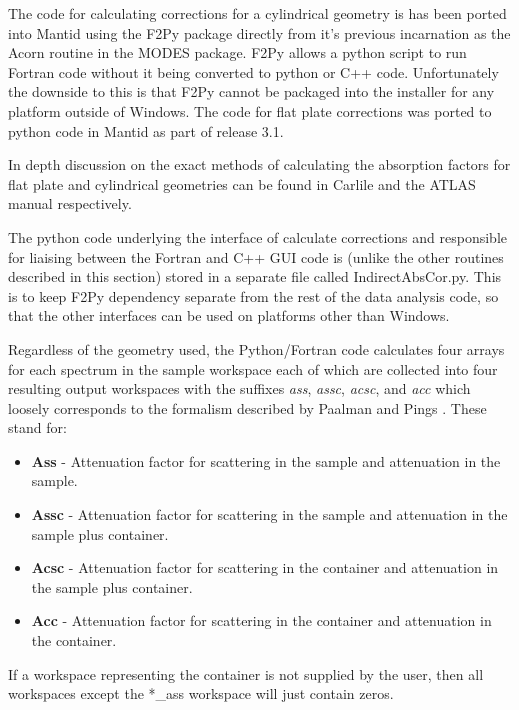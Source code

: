 \documentclass[paper=a4, fontsize=11pt]{scrartcl}	%
\numberwithin{equation}{section}															%
\numberwithin{figure}{section}																%
\numberwithin{table}{section}																%
\begin{document}
The code for calculating corrections for a cylindrical geometry is has been ported into Mantid using the F2Py package directly from it's previous incarnation as the Acorn routine in the MODES package. F2Py allows a python script to run Fortran code without it being converted to python or C++ code. Unfortunately the downside to this is that F2Py cannot be packaged into the installer for any platform outside of Windows. The code for flat plate corrections was ported to python code in Mantid as part of release 3.1.

In depth discussion on the exact methods of calculating the absorption factors for flat plate and cylindrical geometries can be found in Carlile \cite{ccarlile1974} and the ATLAS manual \cite{aksoper1989} respectively.

The python code underlying the interface of calculate corrections and responsible for liaising between the Fortran and C++ GUI code is (unlike the other routines described in this section) stored in a separate file called IndirectAbsCor.py. This is to keep F2Py dependency separate from the rest of the data analysis code, so that the other interfaces can be used on platforms other than Windows.

Regardless of the geometry used, the Python/Fortran code calculates four arrays for each spectrum in the sample workspace each of which are collected into four resulting output workspaces with the suffixes \textit{ass}, \textit{assc}, \textit{acsc}, and \textit{acc} which loosely corresponds to the formalism described by Paalman and Pings \cite{hhpaalman1962}. These stand for:

\begin{itemize}
\item \textbf{Ass} - Attenuation factor for scattering in the sample and attenuation in the sample.
\item \textbf{Assc} - Attenuation factor for scattering in the sample and attenuation in the sample plus container.
\item \textbf{Acsc} - Attenuation factor for scattering in the container and attenuation in the sample plus container.
\item \textbf{Acc} - Attenuation factor for scattering in the container and attenuation in the container.
\end{itemize}

If a workspace representing the container is not supplied by the user, then all workspaces except the \**\_ass workspace will just contain zeros.
\end{document}
